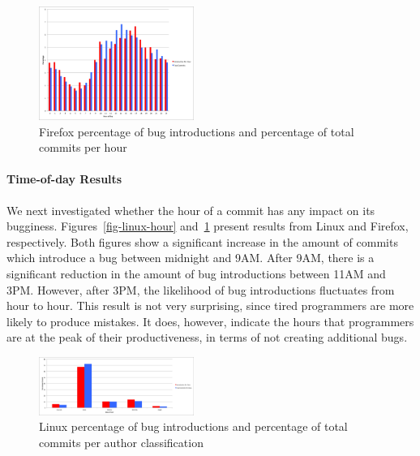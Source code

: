 \begin{figure}
\begin{center}
\includegraphics[width=0.45\textwidth]{firefox_hour_of_day.png}
\end{center}
\caption{Firefox percentage of bug introductions and percentage of total commits per hour}
\label{fig-firefox-hour}
\end{figure}

\paragraph{Time-of-day Results} We next investigated whether the hour of a commit has any impact on
its bugginess. Figures~\ref{fig-linux-hour} and~\ref{fig-firefox-hour}
present results from Linux and Firefox, respectively. Both figures
show a significant increase in the amount of commits which introduce a
bug between midnight and 9AM. After 9AM, there is a significant
reduction in the amount of bug introductions between 11AM and 3PM.
However, after 3PM, the likelihood of bug introductions fluctuates
from hour to hour. This result is not very surprising, since tired
programmers are more likely to produce mistakes. It does, however,
indicate the hours that programmers are at the peak of their
productiveness, in terms of not creating additional bugs.

\begin{figure}
\begin{center}
\includegraphics[width=0.45\textwidth]{linux_per_class.png}
\end{center}
\caption{Linux percentage of bug introductions and percentage of total commits per author classification}
\label{fig-linux-class}
\end{figure}

